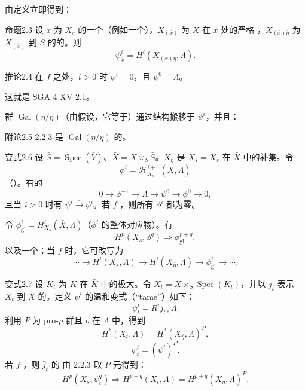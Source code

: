 由定义立即得到：
\begin{SGAresult}{命题}{2.3}
设 $\bar x$ 为 $X_s$ 的一个（例如一个），$X_{(\bar x)}$ 为 $X$ 在 $\bar x$ 处的严格 ，$X_{(\bar x)\bar\eta}$ 为 $X_{(\bar x)}$ 到 $S$ 的的。则
\[
\psi^i_{\bar x}=H^i(X_{(\bar x)\bar\eta},\Lambda).
\]
\end{SGAresult}
\begin{SGAresult}{推论}{2.4}
在 $f$ 之处，$i>0$ 时 $\psi^i=0$，且 $\psi^0=\Lambda$。
\end{SGAresult}
这就是 SGA 4 XV 2.1。

群 $\operatorname{Gal}(\bar\eta/\eta)$（由假设，它等于）通过结构搬移于 $\psi^i$，并且：
\begin{SGAresult}{附论}{2.5}
 2.2.3 是 $\operatorname{Gal}(\bar\eta/\eta)$ 的。
\end{SGAresult}
\begin{SGAresult}{变式}{2.6}
设 $\bar S=\operatorname{Spec}(\bar V)$、$\bar X=X\times_S\bar S$。$X_{\bar\eta}$ 是 $X_s=X_{\bar s}$ 在 $\bar X$ 中的补集。令
\[
\phi^i=\mathcal H_{X_s}^{i+1}(\bar X,\Lambda)
\]
（）。有的
\[
0\longrightarrow\phi^{-1}\longrightarrow\Lambda\longrightarrow\psi^0
\longrightarrow\phi^0\longrightarrow0,
\]
且当 $i>0$ 时有 $\psi^i\xrightarrow{\sim}\phi^i$。若 $f$ ，则所有 $\phi^i$ 都为零。

令 $\phi^i_{\mathrm{gl}}=H^i_{X_s}(\bar X,\Lambda)$（$\phi^i$ 的整体对应物）。有
\[
H^p(X_s,\phi^q)\Longrightarrow\phi^{p+q}_{\mathrm{gl}},\tag{2.6.1}
\]
以及一个；当 $f$ 时，它可改写为
\[
\cdots\longrightarrow H^i(X_s,\Lambda)\longrightarrow H^i(X_{\bar\eta},\Lambda)
\longrightarrow\phi^i_{\mathrm{gl}}\longrightarrow\cdots .\tag{2.6.2}
\]
\end{SGAresult}
\begin{SGAresult}{变式}{2.7}
设 $K_t$ 为 $K$ 在 $\bar K$ 中的极大。令 $X_t=X\times_S\operatorname{Spec}(K_t)$，并以 $\bar j_t$ 表示 $X_t$ 到 $X$ 的。定义 $\psi^i$ 的温和变式（“tame”）如下：
\[
\psi_t^i=R^i\bar j_{t*}\Lambda.
\]
利用 $P$ 为 pro-$p$ 群且 $p$ 在 $\Lambda$ 中，得到
\[
H^*(X_t,\Lambda)=H^*(X_{\bar\eta},\Lambda)^P,\tag{2.7.1}
\]
\[
\psi_t^i=(\psi^i)^P.\tag{2.7.2}
\]
若 $f$ ，则 $\bar j_t$ 的 由 2.2.3 取 $P$ 元得到：
\[
H^p(X_s,\psi_t^q)\Longrightarrow H^{p+q}(X_t,\Lambda)
=H^{p+q}(X_{\bar\eta},\Lambda)^P.\tag{2.7.3}
\]
\end{SGAresult}

